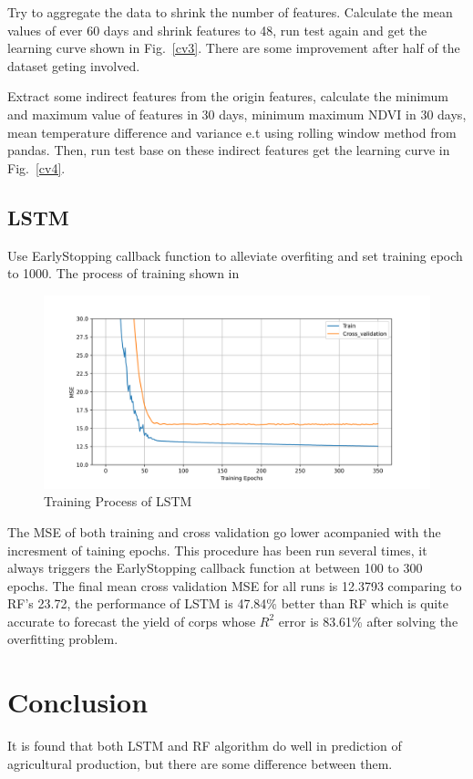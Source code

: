 \documentclass[conference]{IEEEtran}
\begin{document}
Try to aggregate the data to shrink the number of features. Calculate the mean values of ever 60 days and shrink features to 48, run test again and get the learning curve shown in Fig.~\ref{cv3}. There are some improvement after half of the dataset geting involved.

Extract some indirect features from the origin features, calculate the minimum and maximum value of features in 30 days, minimum maximum NDVI in 30 days, mean temperature difference and variance e.t using rolling window method from pandas. Then, run test base on these indirect features get the learning curve in Fig.~\ref{cv4}.

\subsection{LSTM}
Use EarlyStopping callback function to alleviate overfiting and set training epoch to 1000. The process of training shown in %

\begin{figure}[htbp]
  \centerline{\includegraphics[width=\linewidth]{figures/lp.png}}
  \caption{Training Process of LSTM}
  \label{fig:train}
\end{figure}

The MSE of both training and cross validation go lower acompanied with the incresment of taining epochs. This procedure has been run several times, it always triggers the EarlyStopping callback function at between 100 to 300 epochs. The final mean cross validation MSE for all runs is 12.3793 comparing to RF's 23.72, the performance of LSTM is 47.84\% better than RF which is quite accurate to forecast the yield of corps whose $R^2$ error is 83.61\% after solving the overfitting problem.

\section{Conclusion}
It is found that both LSTM and RF algorithm do well in prediction of agricultural production, but there are some difference between them.
\end{document}
